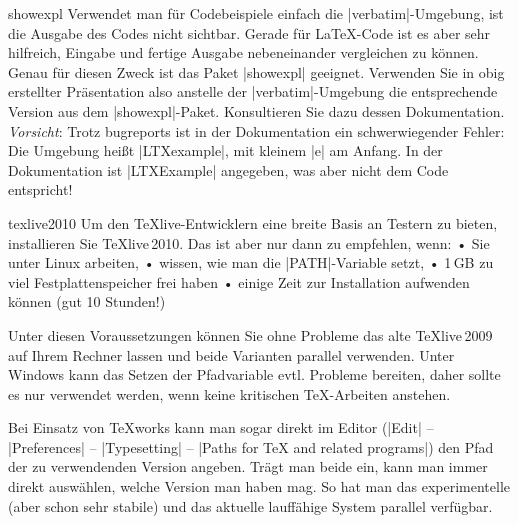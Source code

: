 \documentclass[
	solution,
	blatt=8,
	ausgabe=06.\,06.\,2010,
	rückgabe=11.\,06.\,2010
]{lcourse-hd}
\begin{document}
\begin{expertexercise}[
  name={Codebeispiele advanced},
  abgabe = Integriert in die Abgabe des obigen Dokumentes.]{showexpl}
Verwendet man für Codebeispiele einfach die |verbatim|-Umgebung, ist die Ausgabe des Codes nicht sichtbar. Gerade für \LaTeX-Code ist es aber sehr hilfreich, Eingabe und fertige Ausgabe nebeneinander vergleichen zu können. Genau für diesen Zweck ist das Paket |showexpl| geeignet. Verwenden Sie in obig erstellter Präsentation also anstelle der |verbatim|-Umgebung die entsprechende Version aus dem |showexpl|-Paket. Konsultieren Sie dazu dessen Dokumentation.
\\

\emph{Vorsicht}: Trotz bugreports ist in der Dokumentation ein schwerwiegender Fehler: Die Umgebung heißt |LTXexample|, mit kleinem |e| am Anfang. In der Dokumentation ist |LTXExample| angegeben, was aber nicht dem Code entspricht!
\end{expertexercise}

\begin{expertexercise}[
  name={\TeX live2010},
  abgabe = keine Abgabe nötig]{texlive2010}
Um den \TeX live-Entwicklern eine breite Basis an Testern zu bieten, installieren Sie \TeX live\,2010. Das ist aber nur dann zu empfehlen, wenn:
• Sie unter Linux arbeiten,
• wissen, wie man die |PATH|-Variable setzt,
• 1\,GB zu viel Festplattenspeicher frei haben
• einige Zeit zur Installation aufwenden können (gut 10 Stunden!)

Unter diesen Voraussetzungen können Sie ohne Probleme das alte \TeX live\,2009 auf Ihrem Rechner lassen und beide Varianten parallel verwenden. Unter Windows kann das Setzen der Pfadvariable evtl. Probleme bereiten, daher sollte es nur verwendet werden, wenn keine kritischen \TeX-Arbeiten anstehen.

Bei Einsatz von \TeX works kann man sogar direkt im Editor (|Edit| – |Preferences| – |Typesetting| – |Paths for TeX and related programs|) den Pfad der zu verwendenden Version angeben. Trägt man beide ein, kann man immer direkt auswählen, welche Version man haben mag. So hat man das experimentelle (aber schon sehr stabile) und das aktuelle lauffähige System parallel verfügbar.

\end{expertexercise}
\end{document}
